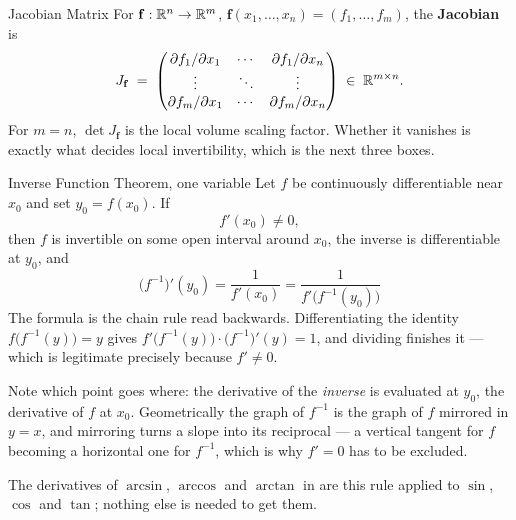 \begin{rulebox}{Jacobian Matrix}
For $\mathbf{f}:\mathbb{R}^{n}\to\mathbb{R}^{m}$,
$\mathbf{f}(x_{1},\ldots,x_{n})=(f_{1},\ldots,f_{m})$, the \textbf{Jacobian}
is
\[
  J_{\mathbf{f}} \;=\;
  \begin{pmatrix}
    \partial f_{1}/\partial x_{1} & \cdots & \partial f_{1}/\partial x_{n}\\
    \vdots & \ddots & \vdots\\
    \partial f_{m}/\partial x_{1} & \cdots & \partial f_{m}/\partial x_{n}
  \end{pmatrix} \;\in\; \mathbb{R}^{m\times n} .
\]
For $m=n$, $\det J_{\mathbf{f}}$ is the local volume scaling factor. Whether
it vanishes is exactly what decides local invertibility, which is the next
three boxes.
\end{rulebox}

\begin{rulebox}{Inverse Function Theorem, one variable}
Let $f$ be continuously differentiable near $x_{0}$ and set $y_{0}=f(x_{0})$.
If
\[
  f'(x_{0})\neq0 ,
\]
then $f$ is invertible on some open interval around $x_{0}$, the inverse is
differentiable at $y_{0}$, and
\[
  \boxed{\;\bigl(f^{-1}\bigr)'(y_{0})=\frac{1}{f'(x_{0})}
        =\frac{1}{f'\bigl(f^{-1}(y_{0})\bigr)}\;}
\]
The formula is the chain rule read backwards. Differentiating the identity
$f\bigl(f^{-1}(y)\bigr)=y$ gives
$f'\bigl(f^{-1}(y)\bigr)\cdot\bigl(f^{-1}\bigr)'(y)=1$, and dividing
finishes it --- which is legitimate precisely because $f'\neq0$.

Note which point goes where: the derivative of the \emph{inverse} is
evaluated at $y_{0}$, the derivative of $f$ at $x_{0}$. Geometrically the
graph of $f^{-1}$ is the graph of $f$ mirrored in $y=x$, and mirroring turns
a slope into its reciprocal --- a vertical tangent for $f$ becoming a
horizontal one for $f^{-1}$, which is why $f'=0$ has to be excluded.

The derivatives of $\arcsin$, $\arccos$ and $\arctan$ in  are this
rule applied to $\sin$, $\cos$ and $\tan$; nothing else is needed to get
them.
\end{rulebox}

